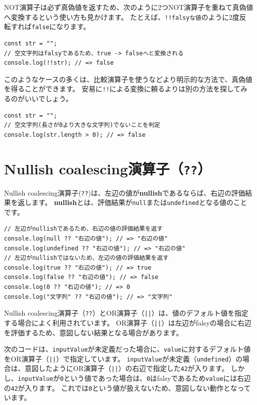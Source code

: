 NOT演算子は必ず真偽値を返すため、次のように2つNOT演算子を重ねて真偽値へ変換するという使い方も見かけます。
たとえば、\texttt{!!falsyな値}のように2度反転すれば\texttt{false}になります。

\begin{lstlisting}
const str = "";
// 空文字列はfalsyであるため、true -> falseへと変換される
console.log(!!str); // => false
\end{lstlisting}

このようなケースの多くは、比較演算子を使うなどより明示的な方法で、真偽値を得ることができます。
安易に\texttt{!!}による変換に頼るよりは別の方法を探してみるのがいいでしょう。

\begin{lstlisting}
const str = "";
// 空文字列(長さが0より大きな文字列)でないことを判定
console.log(str.length > 0); // => false
\end{lstlisting}

\hypertarget{nullish-coalescing-operator}{%
\section[Nullish coalescing演算子（\texttt{??}）]{Nullish coalescing演算子（\texttt{??}）\,\protect{}}\label{nullish-coalescing-operator}}

Nullish coalescing演算子(\texttt{??})は、左辺の値が\textbf{nullish}であるならば、右辺の評価結果を返します。
\textbf{nullish}とは、評価結果が\texttt{null}または\texttt{undefined}となる値のことです。

\begin{lstlisting}
// 左辺がnullishであるため、右辺の値の評価結果を返す
console.log(null ?? "右辺の値"); // => "右辺の値"
console.log(undefined ?? "右辺の値"); // => "右辺の値"
// 左辺がnullishではないため、左辺の値の評価結果を返す
console.log(true ?? "右辺の値"); // => true
console.log(false ?? "右辺の値"); // => false
console.log(0 ?? "右辺の値"); // => 0
console.log("文字列" ?? "右辺の値"); // => "文字列"
\end{lstlisting}

Nullish coalescing演算子（\texttt{??}）とOR演算子（\texttt{||}）は、値のデフォルト値を指定する場合によく利用されています。
OR演算子（\texttt{||}）は左辺がfalsyの場合に右辺を評価するため、意図しない結果となる場合があります。

次のコードは、\texttt{inputValue}が未定義だった場合に、\texttt{value}に対するデフォルト値をOR演算子（\texttt{||}）で指定しています。
\texttt{inputValue}が未定義（\texttt{undefined}）の場合は、意図したようにOR演算子（\texttt{||}）の右辺で指定した\texttt{42}が入ります。
しかし、\texttt{inputValue}が\texttt{0}という値であった場合は、\texttt{0}はfalsyであるため\texttt{value}には右辺の\texttt{42}が入ります。
これでは\texttt{0}という値が扱えないため、意図しない動作となっています。

